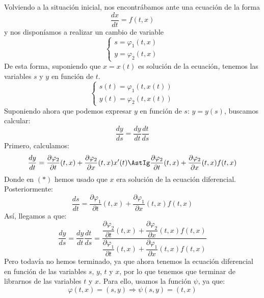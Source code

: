 Volviendo a la situación inicial, nos encontrábamos ante una ecuación de la forma
\begin{equation*}
    \dfrac{dx}{dt} = f(t,x)
\end{equation*}
y nos disponíamos a realizar un cambio de variable
\begin{equation*}
    \left\{\begin{array}{rl}
        s = \varphi_1(t,x) \\
        y = \varphi_2(t,x) 
    \end{array}\right.
\end{equation*}
De esta forma, suponiendo que $x=x(t)$ es solución de la ecuación, tenemos las variables $s$ y $y$ en función de $t$. 
\begin{equation*}
    \left\{\begin{array}{rl}
        s(t) = \varphi_1(t,x(t)) \\
        y(t) = \varphi_2(t,x(t)) 
    \end{array}\right.
\end{equation*}
Suponiendo ahora que podemos expresar $y$ en función de $s$: $y = y(s)$, buscamos calcular:
\begin{equation*}
    \dfrac{dy}{ds} = \dfrac{dy}{dt} \dfrac{dt}{ds}
\end{equation*}
Primero, calculamos:
\begin{equation*}
    \dfrac{dy}{dt} = \dfrac{\partial\varphi_2}{\partial t}(t,x) + \dfrac{\partial\varphi_2}{\partial x}(t,x)x'(t) \AstIg \dfrac{\partial\varphi_2}{\partial t}(t,x) + \dfrac{\partial\varphi_2}{\partial x}(t,x)f(t,x)
\end{equation*}
Donde en $(\ast)$ hemos usado que $x$ era solución de la ecuación diferencial. Posteriormente:
\begin{equation*}
    \dfrac{ds}{dt} = \dfrac{\partial\varphi_1}{\partial t}(t,x) + \dfrac{\partial\varphi_1}{\partial x}(t,x) f(t,x)
\end{equation*}
Así, llegamos a que:
\begin{equation*}
    \dfrac{dy}{ds} = \dfrac{dy}{dt}\dfrac{dt}{ds} = \dfrac{\dfrac{\partial\varphi_2}{\partial t}(t,x) + \dfrac{\partial\varphi_2}{\partial x}(t,x)f(t,x)}{\dfrac{\partial\varphi_1}{\partial t}(t,x) + \dfrac{\partial\varphi_1}{\partial x}(t,x) f(t,x)} 
\end{equation*}
Pero todavía no hemos terminado, ya que ahora tenemos la ecuación diferencial en función de las variables $s$, $y$, $t$ y $x$, por lo que tenemos que terminar de librarnos de las variables $t$ y $x$. Para ello, usamos la función $\psi$, ya que:
\begin{equation*}
    \varphi(t,x) = (s,y) \Longrightarrow \psi(s,y) = (t,x)
\end{equation*}

